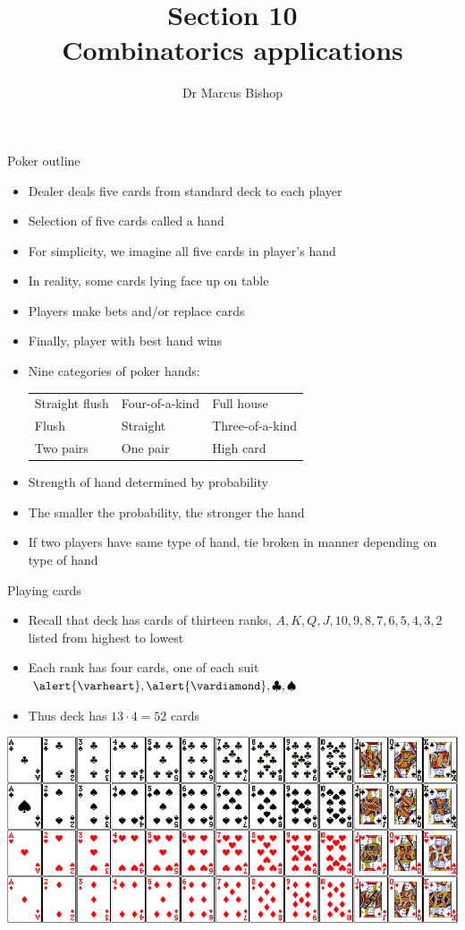 \documentclass[handout]{beamer}
\title[\S10]{Section 10\\Combinatorics applications}
\author{Dr Marcus Bishop}
\theoremstyle{definition}
\newcommand{\hs}{\alert{\varheart}}
\newcommand{\ds}{\alert{\vardiamond}}
\newcommand{\s}{\spadesuit}
\newcommand{\cs}{\clubsuit}
\begin{document}
\begin{frame}\titlepage\end{frame}
\LogoOff

\begin{frame}{Poker outline}
\begin{itemize}
\item Dealer deals five cards from standard deck
to each player
\item Selection of five cards called a \alert{hand}
\item For simplicity, we imagine all five cards in player's hand
\item In reality, some cards lying face up on table
\item Players make bets and/or replace cards
\item Finally, player with \alert{best hand} wins
\item Nine categories of poker hands:
\begin{tabular}{lll}
Straight flush&Four-of-a-kind&Full house\\
Flush&Straight&Three-of-a-kind\\
Two pairs&One pair&High card
\end{tabular}
\item Strength of hand determined by probability
\item The smaller the probability, the stronger the hand
\item If two players have same type of hand, tie
broken in manner depending on type of hand
\end{itemize}
\end{frame}

\begin{frame}{Playing cards}
\begin{itemize}
\item Recall that deck has cards of thirteen \alert{ranks},
$A,K,Q,J,10,9,8,7,6,5,4,3,2$
listed from highest to lowest
\item Each rank has four cards, one of each \alert{suit} $\hs,\ds,\cs,\s$
\item Thus deck has $13\cdot 4=52$ cards
\end{itemize}
\includegraphics[scale=.3]{cards}
\end{frame}
\end{document}
